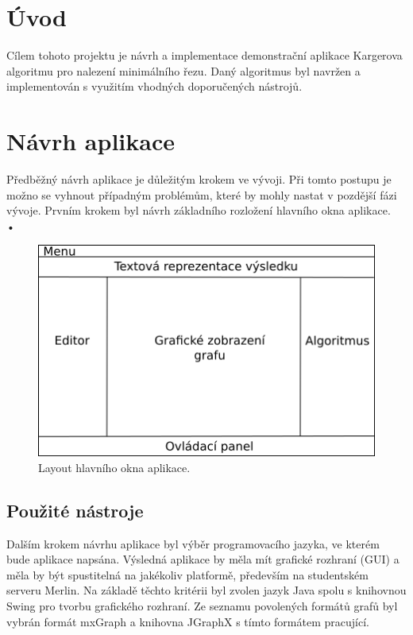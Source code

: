 \documentclass[../projekt.tex]{subfiles}
\begin{document}

\section{Úvod}\label{uvod}

Cílem tohoto projektu je návrh a implementace demonstrační aplikace Kargerova algoritmu pro nalezení minimálního řezu. Daný algoritmus byl navržen a implementován s využitím vhodných doporučených nástrojů. 




\section{Návrh aplikace}

Předběžný návrh aplikace je důležitým krokem ve vývoji. Při tomto postupu je možno se vyhnout případným problémům, které by mohly nastat v pozdější fázi vývoje. Prvním krokem byl návrh základního rozložení hlavního okna aplikace.  \\•

	\begin{figure}[ht]
    	\begin{center}
  			\includegraphics[scale=0.7]{obrazky-figures/layout.png}
  			\caption{Layout hlavního okna aplikace.}
  			\label{fig:layout}
  		\end{center}
	\end{figure}

\subsection{Použité nástroje}

Dalším krokem návrhu aplikace byl výběr programovacího jazyka, ve kterém bude aplikace napsána. Výsledná aplikace by měla mít grafické rozhraní (GUI) a měla by být spustitelná na jakékoliv platformě, především na studentském serveru Merlin. Na základě těchto kritérii byl zvolen jazyk Java spolu s knihovnou Swing pro tvorbu grafického rozhraní. Ze seznamu povolených formátů grafů byl vybrán formát mxGraph a knihovna JGraphX s tímto formátem pracující. \\
\end{document}
